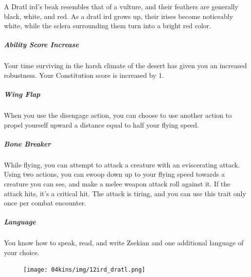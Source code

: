 A Dratl ird's beak resembles that of a vulture, and their feathers are generally black, white, and red.
As a dratl ird grows up, their irises become noticeably white, while the sclera surrounding them turn into a bright red color.

\subparagraph{Ability Score Increase} Your time surviving in the harsh climate of the desert has given you an increased robustness.
Your Constitution score is increased by 1.

\subparagraph{Wing Flap} When you use the disengage action, you can choose to use another action to propel yourself upward a distance equal to half your flying speed.

\subparagraph{Bone Breaker} While flying, you can attempt to attack a creature with an eviscerating attack.
Using two actions, you can swoop down up to your flying speed towards a creature you can see, and make a melee weapon attack roll against it.
If the attack hits, it's a critical hit.
The attack is tiring, and you can use this trait only once per combat encounter.

\subparagraph{Language} You know how to speak, read, and write Zsekian and one additional language of your choice.

\begin{figure}[!b]
    \centering
    \texttt{[image: 04kins/img/12ird\_dratl.png]}
\end{figure}


\newpage
